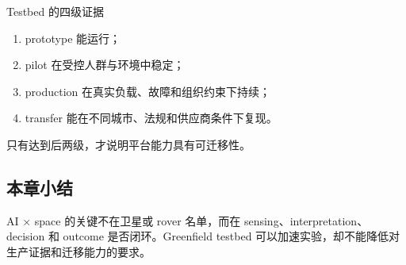 \begin{importantbox}{Testbed 的四级证据}
\begin{enumerate}
  \item prototype 能运行；
  \item pilot 在受控人群与环境中稳定；
  \item production 在真实负载、故障和组织约束下持续；
  \item transfer 能在不同城市、法规和供应商条件下复现。
\end{enumerate}
只有达到后两级，才说明平台能力具有可迁移性。
\end{importantbox}

\subsection{本章小结}

AI × space 的关键不在卫星或 rover 名单，而在 sensing、interpretation、decision 和 outcome 是否闭环。Greenfield testbed 可以加速实验，却不能降低对生产证据和迁移能力的要求。

